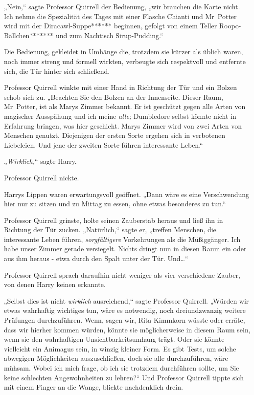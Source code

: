 {„Nein,“ sagte Professor Quirrell der Bedienung, „wir brauchen die Karte nicht. Ich nehme die Spezialität des Tages mit einer Flasche Chianti und Mr~Potter wird mit der Diracawl-Suppe****** beginnen, gefolgt von einem Teller Roopo-Bällchen******* und zum Nachtisch Sirup-Pudding.“

Die Bedienung, gekleidet in Umhänge die, trotzdem sie kürzer als üblich waren, noch immer streng und formell wirkten, verbeugte sich respektvoll und entfernte sich, die Tür hinter sich schließend.

Professor Quirrell winkte mit einer Hand in Richtung der Tür und ein Bolzen schob sich zu. „Beachten Sie den Bolzen an der Innenseite. Dieser Raum, Mr~Potter, ist als Marys Zimmer bekannt. Er ist geschützt gegen alle Arten von magischer Ausspähung und ich meine \emph{alle;} Dumbledore selbst könnte nicht in Erfahrung bringen, was hier geschieht. Marys Zimmer wird von zwei Arten von Menschen genutzt. Diejenigen der ersten Sorte ergehen sich in verbotenen Liebeleien. Und jene der zweiten Sorte führen interessante Leben.“

„\emph{Wirklich,}“ sagte Harry.

Professor Quirrell nickte.

Harrys Lippen waren erwartungsvoll geöffnet. „Dann wäre es eine Verschwendung hier nur zu sitzen und zu Mittag zu essen, ohne etwas besonderes zu tun.“

Professor Quirrell grinste, holte seinen Zauberstab heraus und ließ ihn in Richtung der Tür zucken. „Natürlich,“ sagte er, „treffen Menschen, die interessante Leben führen, \emph{sorgfältigere} Vorkehrungen als die Müßiggänger. Ich habe unser Zimmer gerade versiegelt. Nichts dringt nun in diesen Raum ein oder aus ihm heraus - etwa durch den Spalt unter der Tür. Und…“

Professor Quirrell sprach daraufhin nicht weniger als vier verschiedene Zauber, von denen Harry keinen erkannte.

„Selbst dies ist nicht \emph{wirklich} ausreichend,“ sagte Professor Quirrell. „Würden wir etwas wahrhaftig wichtiges tun, wäre es notwendig, noch dreiundzwanzig weitere Prüfungen durchzuführen. Wenn, sagen wir, Rita Kimmkorn wüsste oder erräte, dass wir hierher kommen würden, könnte sie möglicherweise in diesem Raum sein, wenn sie den wahrhaftigen Unsichtbarkeitsumhang trägt. Oder sie könnte vielleicht ein Animagus sein, in winzig kleiner Form. Es gibt Tests, um solche abwegigen Möglichkeiten auszuschließen, doch sie alle durchzuführen, wäre mühsam. Wobei ich mich frage, ob ich sie trotzdem durchführen sollte, um Sie keine schlechten Angewohnheiten zu lehren?“ Und Professor Quirrell tippte sich mit einem Finger an die Wange, blickte nachdenklich drein.

}
